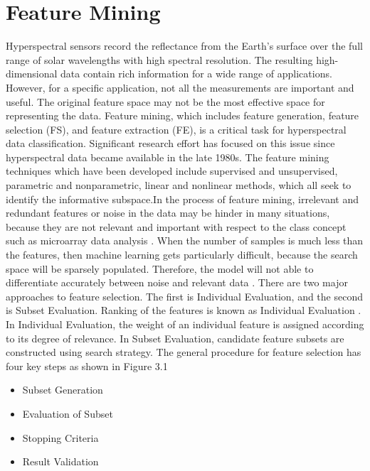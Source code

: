 \documentclass[document.tex]{subfiles}
\begin{document}
\section{Feature Mining}
Hyperspectral sensors record the reflectance from the Earth's surface over the full range of solar wavelengths with high spectral resolution. The resulting high-dimensional data contain rich information for a wide range of applications. However, for a specific application, not all the measurements are important and useful. The original feature space may not be the most effective space for representing the data. Feature mining\cite{33}, which includes feature generation, feature selection (FS), and feature extraction (FE)\cite{5}, is a critical task for hyperspectral data classification. Significant research effort has focused on this issue since hyperspectral data became available in the late 1980s. The feature mining techniques which have been developed include supervised and unsupervised, parametric and nonparametric, linear and nonlinear methods, which all seek to identify the informative subspace.In the process of feature mining, irrelevant and redundant features or noise in the data
may be hinder in many situations, because they are not relevant and important with respect to the class concept such as microarray data analysis . When the number of samples
is much less than the features, then machine learning gets particularly difficult, because
the search space will be sparsely populated. Therefore, the model will not able to differentiate accurately between noise and relevant data . There are two major approaches to
feature selection. The first is Individual Evaluation, and the second is Subset Evaluation.
Ranking of the features is known as Individual Evaluation . In Individual Evaluation,
the weight of an individual feature is assigned according to its degree of relevance. In
Subset Evaluation, candidate feature subsets are constructed using search strategy. The
general procedure for feature selection has four key steps as shown in Figure 3.1
\begin{itemize}
	\item Subset Generation
	\item Evaluation of Subset
	\item Stopping Criteria
	\item Result Validation
\end{itemize}
\end{document}
